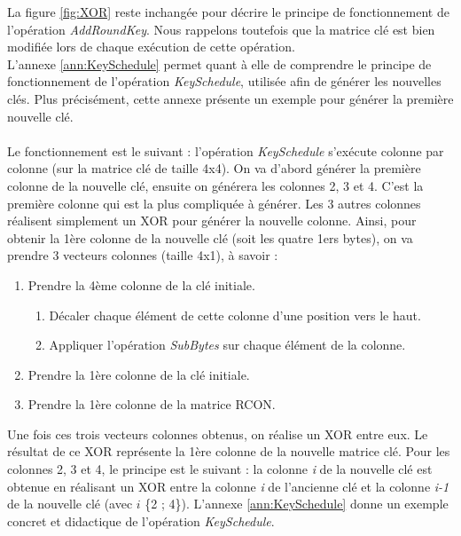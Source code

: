 \documentclass[oneside]{book}
\begin{document}
\begin{description}
La figure \ref{fig:XOR} reste inchangée pour décrire le principe de fonctionnement de l'opération \textit{AddRoundKey}. Nous rappelons toutefois que la matrice clé est bien modifiée lors de chaque exécution de cette opération. \\
L'annexe \ref{ann:KeySchedule} permet quant à elle de comprendre le principe de fonctionnement de l'opération \textit{KeySchedule}, utilisée afin de générer les nouvelles clés. Plus précisément, cette annexe présente un exemple pour générer la première nouvelle clé. \\ \\
Le fonctionnement est le suivant : l'opération \textit{KeySchedule} s'exécute colonne par colonne (sur la matrice clé de taille 4x4). On va d'abord générer la première colonne de la nouvelle clé, ensuite on générera les colonnes 2, 3 et 4. C'est la première colonne qui est la plus compliquée à générer. Les 3 autres colonnes réalisent simplement un XOR pour générer la nouvelle colonne.
Ainsi, pour obtenir la 1ère colonne de la nouvelle clé (soit les quatre 1ers bytes), on va prendre 3 vecteurs colonnes (taille 4x1), à savoir : 
\begin{enumerate}
\item Prendre la 4ème colonne de la clé initiale.
\begin{enumerate}
\item Décaler chaque élément de cette colonne d'une position vers le haut.
\item Appliquer l'opération \textit{SubBytes} sur chaque élément de la colonne.
\end{enumerate}
\item Prendre la 1ère colonne de la clé initiale.
\item Prendre la 1ère colonne de la matrice RCON.
\end{enumerate}
Une fois ces trois vecteurs colonnes obtenus, on réalise un XOR entre eux. Le résultat de ce XOR représente la 1ère colonne de la nouvelle matrice clé. Pour les colonnes 2, 3 et 4, le principe est le suivant : la colonne \textit{i} de la nouvelle clé est obtenue en réalisant un XOR entre la colonne \textit{i} de l'ancienne clé et la colonne \textit{i-1} de la nouvelle clé (avec $i$ {\epsilon} \{2 ; 4\}). L'annexe \ref{ann:KeySchedule} donne un exemple concret et didactique de l'opération \textit{KeySchedule}.

\end{description}


\newpage

\end{document}
